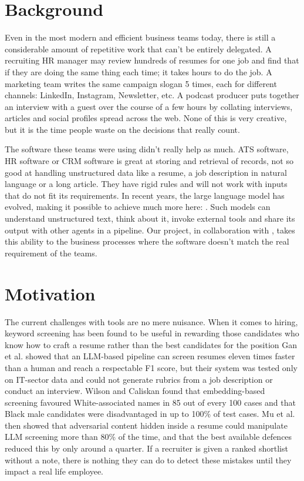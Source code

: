 
\section{Background}
Even in the most modern and efficient business teams today, there is still a considerable amount of repetitive work that can't be entirely delegated. A recruiting HR manager may review hundreds of resumes for one job and find that if they are doing the same thing each time; it takes hours to do the job. A marketing team writes the same campaign slogan 5 times, each for different channels: LinkedIn, Instagram, Newsletter, etc. A podcast producer puts together an interview with a guest over the course of a few hours by collating interviews, articles and social profiles spread across the web. None of this is very creative, but it is the time people waste on the decisions that really count.

The software these teams were using didn't really help as much. ATS software, HR software or CRM software is great at storing and retrieval of records, not so good at handling unstructured data like a resume, a job description in natural language or a long article. They have rigid rules and will not work with inputs that do not fit its requirements. In recent years, the large language model has evolved, making it possible to achieve much more here: \cite{autogen,guo,react}. Such models can understand unstructured text, think about it, invoke external tools and share its output with other agents in a pipeline. Our project, in collaboration with \Partner, takes this ability to the business processes where the software doesn't match the real requirement of the teams.

\section{Motivation}
The current challenges with tools are no mere nuisance. When it comes to hiring, keyword screening has been found to be useful in rewarding those candidates who know how to craft a resume rather than the best candidates for the position Gan et al. \cite{gan} showed that an LLM-based pipeline can screen resumes eleven times faster than a human and reach a respectable F1 score, but their system was tested only on IT-sector data and could not generate rubrics from a job description or conduct an interview. Wilson and Caliskan \cite{wilson} found that embedding-based screening favoured White-associated names in 85 out of every 100 cases and that Black male candidates were disadvantaged in up to 100\% of test cases. Mu et al. \cite{mu} then showed that adversarial content hidden inside a resume could manipulate LLM screening more than 80\% of the time, and that the best available defences reduced this by only around a quarter. If a recruiter is given a ranked shortlist without a note, there is nothing they can do to detect these mistakes until they impact a real life employee.

